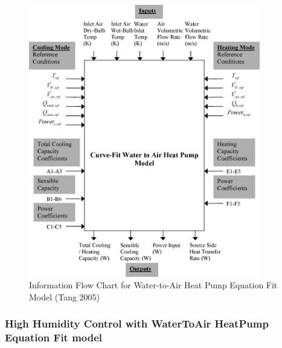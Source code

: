 \begin{figure}[hbtp] %
\centering
\includegraphics[width=0.9\textwidth, height=0.9\textheight, keepaspectratio=true]{media/image5250.png}
\caption{Information Flow Chart for Water-to-Air Heat Pump Equation Fit Model (Tang 2005) \protect \label{fig:information-flow-chart-for-water-to-air-heat}}
\end{figure}

\subsubsection{High Humidity Control with WaterToAir HeatPump Equation Fit model}\label{high-humidity-control-with-watertoair-heatpump-equation-fit-model}


